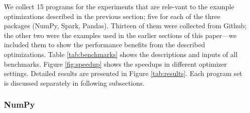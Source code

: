 \documentclass[sigconf]{acmart}\settopmatter{printfolios=true,printccs=false,printacmref=false}\setcopyright{none}
\begin{document}
  
  
          


We collect 15 programs for the experiments that are rele-vant to the example optimizations described in the previous section; five for each of the three packages (NumPy, Spark, Pandas). Thirteen of them were collected from Github; the other two were the examples used in the earlier sections of this paper---we included them to show the performance benefits from the described optimizations. Table \ref{tab:benchmarks} shows the descriptions and inputs of all benchmarks. Figure \ref{fig:speedup} shows the speedups in different optimizer settings. Detailed results are presented in Figure \ref{tab:results}. Each program set is discussed separately in following subsections.



\subsubsection{NumPy}
\end{document}
